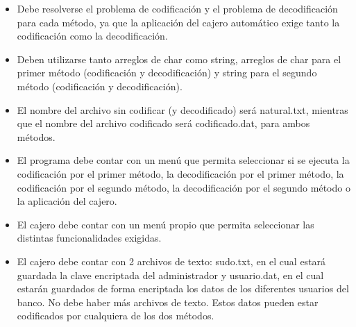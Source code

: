\documentclass{article}
\begin{document}
\begin{itemize}
\item Debe resolverse el problema de codificación y el problema de decodificación  para cada método, ya que la aplicación del cajero automático exige tanto la  codificación como la decodificación.\\
\end{itemize}
 
\begin{itemize}
\item Deben utilizarse tanto arreglos de char como string, arreglos de char para el  primer método (codificación y decodificación) y string para el segundo  método (codificación y decodificación). \\
\end{itemize}

\begin{itemize}
\item El nombre del archivo sin codificar (y decodificado) será natural.txt, mientras  que el nombre del archivo codificado será codificado.dat, para ambos  métodos. \\
\end{itemize}

\begin{itemize}
\item El programa debe contar con un menú que permita seleccionar si se ejecuta  la codificación por el primer método, la decodificación por el primer método,  la codificación por el segundo método, la decodificación por el segundo método o la aplicación del cajero.\\ 
\end{itemize}

\begin{itemize}
\item El cajero debe contar con un menú propio que permita seleccionar las  distintas funcionalidades exigidas. 
\end{itemize}

\begin{itemize}
\item El cajero debe contar con 2 archivos de texto: sudo.txt, en el cual estará  guardada la clave encriptada del administrador y usuario.dat, en el cual  estarán guardados de forma encriptada los datos de los diferentes usuarios  del banco. No debe haber más archivos de texto. Estos datos pueden estar 
			codificados por cualquiera de los dos métodos. \\
\end{itemize}
\end{document}
